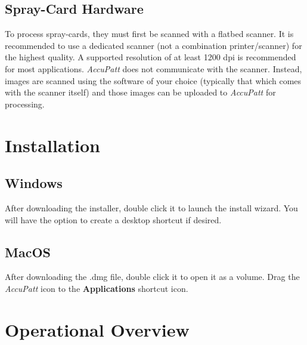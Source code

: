\documentclass[10pt,letterpaper,titlepage]{article}
\begin{document}
    \subsection{Spray-Card Hardware}
    To process spray-cards, they must first be scanned with a flatbed scanner. It is recommended to use a dedicated scanner (not a combination printer/scanner) for the highest quality. A supported resolution of at least 1200 dpi is recommended for most applications. \textit{AccuPatt} does not communicate with the scanner. Instead, images are scanned using the software of your choice (typically that which comes with the scanner itself) and those images can be uploaded to \textit{AccuPatt} for processing.
    
    \newpage

    \section{Installation}

    \subsection{Windows}
    After downloading the installer, double click it to launch the install wizard. You will have the option to create a desktop shortcut if desired. 

    \subsection{MacOS}
    After downloading the .dmg file, double click it to open it as a volume. Drag the \textit{AccuPatt} icon to the \textbf{Applications} shortcut icon. 

    \newpage

    \section{Operational Overview}
    
\end{document}
